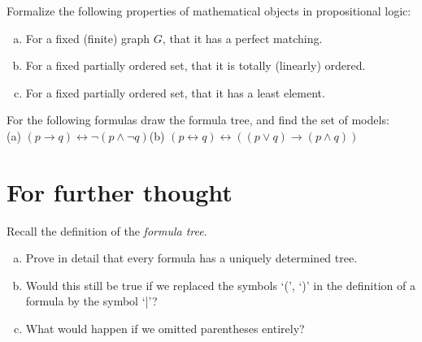 \begin{problem}

    Formalize the following properties of mathematical objects in propositional logic:
    \begin{enumerate}[(a)]
        \item For a fixed (finite) graph $G$, that it has a perfect matching.
        \item For a fixed partially ordered set, that it is totally (linearly) ordered.
        \item For a fixed partially ordered set, that it has a least element.
    \end{enumerate}

\end{problem}


\begin{problem} 
    
    For the following formulas draw the formula tree, and find the set of models: \\(a) $(p \to q) \leftrightarrow \neg (p \wedge \neg q)$\qquad (b) $(p \leftrightarrow q) \leftrightarrow ((p \vee q) \to (p \wedge q))$

\end{problem}



\section*{For further thought}


\begin{problem}

    Recall the definition of the \emph{formula tree}.
    \begin{enumerate}[(a)]
        \item Prove in detail that every formula has a uniquely determined tree.
        \item Would this still be true if we replaced the symbols `(', `)' in the definition of a formula by the symbol `|'?
        \item What would happen if we omitted parentheses entirely?
    \end{enumerate}

\end{problem}
